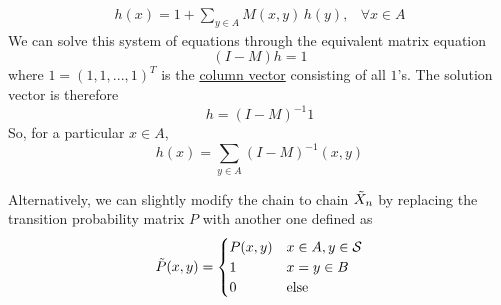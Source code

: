     \begin{align*}
      h(x) = 1 + \sum_{y \in A} M(x, y) \, h(y), & \forall x \in A
    \end{align*}
    We can solve this system of equations through the equivalent matrix equation
    \begin{equation}
      (I - M) h = 1
    \end{equation}
    where $1 = (1, 1, ..., 1)^T$ is the \hyperref[lin-def:column-vector]{column vector} consisting of all $1$'s. The solution vector is therefore
    \begin{equation}
      h = (I - M)^{-1} 1
    \end{equation}
    So, for a particular $x \in A$, 
    \begin{equation}
      h(x) = \sum_{y \in A} (I - M)^{-1} (x, y)
    \end{equation}

    Alternatively, we can slightly modify the chain to chain $\Tilde{X}_n$ by replacing the transition probability matrix $P$ with another one defined as 
    \begin{equation}
      \Tilde{P}(x, y) = \begin{cases}
      P(x, y) & x \in A, y \in \mathcal{S} \\
      1 & x = y \in B \\
      0 & \text{else}
      \end{cases}
    \end{equation}

